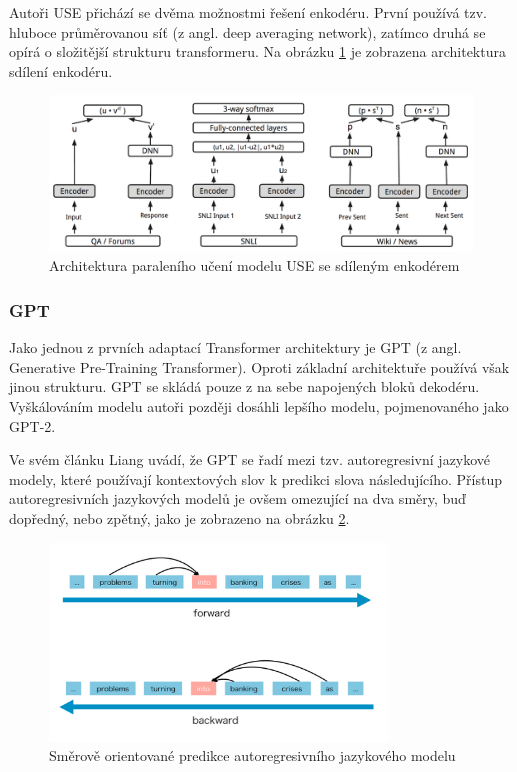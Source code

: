 \documentclass[thesis=M,czech]{FITthesis}[2019/12/23]
\begin{document}
Autoři USE přichází se dvěma možnostmi řešení enkodéru. První používá tzv. hluboce průměrovanou síť (z angl. deep averaging network), zatímco druhá se opírá o složitější strukturu transformeru\cite{yang2018}.
 Na obrázku \ref{fig:yang2018USE} je zobrazena architektura sdílení enkodéru.
\begin{figure}\centering
	\includegraphics[width=\textwidth]{images/yang2018_USE.png}
	\caption{Architektura paraleního učení modelu USE se sdíleným enkodérem\cite{yang2018}}\label{fig:yang2018USE}
\end{figure}

\subsubsection*{GPT}
Jako jednou z prvních adaptací Transformer architektury je GPT (z angl. Generative Pre-Training Transformer)\cite{radford2018}. Oproti základní architektuře používá však jinou strukturu. GPT se skládá pouze z na sebe napojených bloků dekodéru. Vyškálováním modelu autoři později dosáhli lepšího modelu, pojmenovaného jako GPT-2\cite{radford2019}.

Ve svém článku\cite{liang2019} Liang uvádí, že GPT se řadí mezi tzv. autoregresivní jazykové modely, které používají kontextových slov k predikci slova následujícího. Přístup autoregresivních jazykových modelů je ovšem omezující na dva směry, buď dopředný, nebo zpětný, jako je zobrazeno na obrázku \ref{fig:liang2019GPT}.
\begin{figure}\centering
	\includegraphics[width=0.8\textwidth]{images/liang2019/liang2019_GPT.png}
	\caption{Směrově orientované predikce autoregresivního jazykového modelu\cite{liang2019}}\label{fig:liang2019GPT}
\end{figure}
\end{document}
